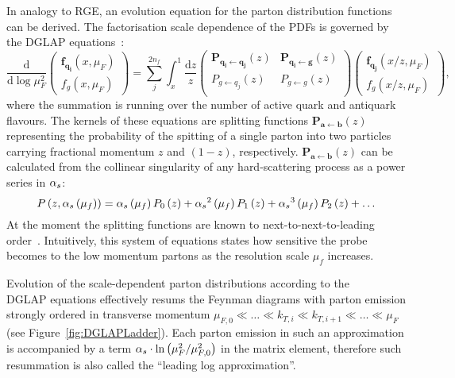 In analogy to RGE, an evolution equation for the parton distribution functions can be derived. The factorisation scale dependence of the PDFs is governed by the DGLAP equations~\cite{Altarelli:1977zs,Gribov:1972,Dokshitzer:1977,Balitsky:1978}:
\begin{equation}
\frac{\mathrm{d}}{\mathrm{d}\log{\mu_F^2}}
 \begin{pmatrix}
	\mathbf{f_{q_i}}\left(x,\mu_F\right) \\
	f_g\left(x,\mu_F\right)
 \end{pmatrix} = 
\sum_j^{2n_f}{\int_x^1{\frac{\mathrm{d}z}{z}
 \begin{pmatrix}
  \mathbf{P_{q_i \leftarrow q_j}}\left(z\right) & \mathbf{P_{q_i \leftarrow  g}}\left(z\right) \\
  P_{g \leftarrow q_j}\left(z\right) & P_{g \leftarrow g}\left(z\right) \\
 \end{pmatrix}
 \begin{pmatrix}
	\mathbf{f_{q_j}}\left(x/z,\mu_F\right) \\
	f_g\left(x/z,\mu_F\right)
 \end{pmatrix}
}},
\end{equation}
where the summation is running over the number of active quark and antiquark flavours. The kernels of these equations are splitting functions $\mathbf{P_{a \leftarrow  b}}\left(z\right)$ representing the probability of the spitting of a single parton into two particles carrying fractional momentum $z$ and $\left(1-z\right)$, respectively. $\mathbf{P_{a \leftarrow  b}}\left(z\right)$ can be calculated from the collinear singularity of any hard-scattering process as a power series in $\mbox{$\alpha_{s}$}$:
\begin{equation}
P\left(z,\as\left(\mu_f\right)\right) = \as\left(\mu_f\right) P_0\left(z\right) + \as^2\left(\mu_f\right)P_1\left(z\right) + \as^3\left(\mu_f\right)P_2\left(z\right) + \dots
\label{eq:splittingfunc}
\end{equation}
At the moment the splitting functions are known to next-to-next-to-leading order~\cite{Vogt:2004mw,Moch:2004pa}. Intuitively, this system of equations states how sensitive the probe becomes to the low momentum partons as the resolution scale $\mu_f$ increases. %

Evolution of the scale-dependent parton distributions according to the \\DGLAP equations effectively resums the Feynman diagrams with parton emission strongly ordered in transverse momentum $ \mu_{F,0} \ll \ldots \ll k_{T,i} \ll k_{T,i+1} \ll \ldots \ll \mu_F$ (see Figure~\ref{fig:DGLAPLadder}). Each parton emission in such an approximation is accompanied by a term $\mbox{$\alpha_{s}$}\cdot\ln{\left(\mu^2_F/\mu^2_{F,0}\right)}$ in the matrix element, therefore such resummation is also called the ``leading log approximation''.

